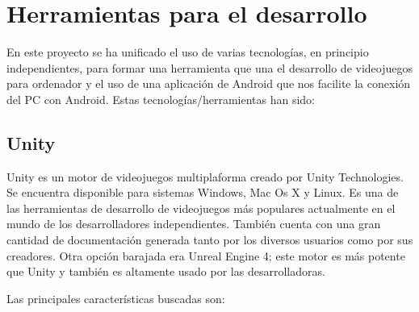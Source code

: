 \section{Herramientas para el desarrollo}
\label{cap2:sec:herramientas}

En este proyecto se ha unificado el uso de varias tecnolog\'ias, en principio independientes, para formar una herramienta que una el desarrollo de videojuegos para ordenador y el uso de una aplicaci\'on de Android que nos facilite la conexi\'on del PC con Android. Estas tecnolog\'ias/herramientas han sido:
\subsection{Unity}
\label{cap2:subsec:unity}

Unity es un motor de videojuegos multiplaforma creado por Unity Technologies. Se encuentra disponible para sistemas Windows, Mac Os X y Linux. Es una de las herramientas de desarrollo de videojuegos m\'as populares actualmente en el mundo de los desarrolladores independientes. Tambi\'en cuenta con una gran cantidad de documentaci\'on generada tanto por los diversos usuarios como por sus creadores. Otra opci\'on barajada era Unreal Engine 4; este motor es m\'as potente que Unity y tambi\'en es altamente usado por las desarrolladoras.

Las principales caracter\'isticas buscadas son:

